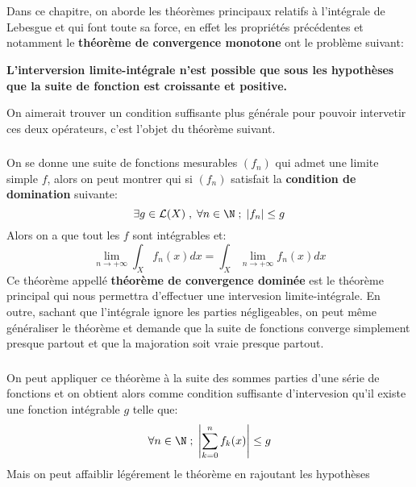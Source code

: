 \chapter*{} %

Dans ce chapitre, on aborde les théorèmes principaux relatifs à l'intégrale de Lebesgue et qui font toute sa force, en effet les propriétés précédentes et notamment le \textbf{théorème de convergence monotone} ont le problème suivant:
\begin{center}
   \textbf{L'interversion limite-intégrale n'est possible que sous les hypothèses que la suite de fonction est croissante et positive.}
\end{center}
On aimerait trouver un condition suffisante plus générale pour pouvoir intervetir ces deux opérateurs, c'est l'objet du théorème suivant.

\subsection*{}
On se donne une suite de fonctions mesurables \((f_n)\) qui admet une limite simple \(f\), alors on peut montrer qui si \((f_n)\) satisfait la \textbf{condition de domination} suivante:
\[
   \exists g \in \mathcal{L}(X) \; , \; \forall n \in \N \; ; \; |f_n| \leq g
\]
Alors on a que tout les \(f\) sont intégrables et:
\[
   \lim_{n \rightarrow +\infty} \int_X f_n(x) dx = \int_X \lim_{n \rightarrow +\infty} f_n(x) dx
\]
Ce théorème appellé \textbf{théorème de convergence dominée} est le théorème principal qui nous permettra d'effectuer une intervesion limite-intégrale. En outre, sachant que l'intégrale ignore les parties négligeables, on peut même généraliser le théorème et demande que la suite de fonctions converge simplement presque partout et que la majoration soit vraie presque partout.

\subsection*{}
On peut appliquer ce théorème à la suite des sommes parties d'une série de fonctions et on obtient alors comme condition suffisante d'intervesion qu'il existe une fonction intégrable \(g\) telle que:
\[
   \forall n \in \N \; ; \; \left|\sum_{k=0}^{n} f_k(x)\right| \leq g
\]
Mais on peut affaiblir légérement le théorème en rajoutant les hypothèses 

